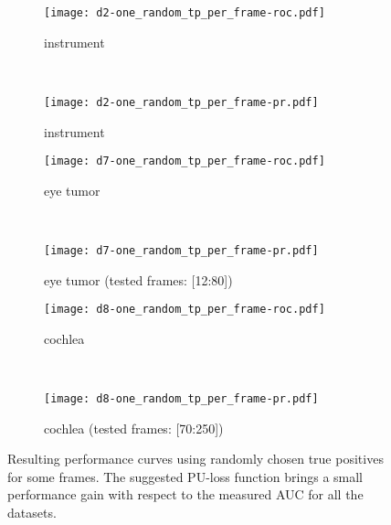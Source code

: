 \begin{figure}[ht]
	\centering
	\begin{subfigure}[h]{0.45\textwidth}
	\texttt{[image: d2-one\_random\_tp\_per\_frame-roc.pdf]}	
		\caption*{instrument}
	\end{subfigure}
	~
	\begin{subfigure}[h]{0.45\textwidth}
	\texttt{[image: d2-one\_random\_tp\_per\_frame-pr.pdf]}	
		\caption*{instrument}
	\end{subfigure}
	
	\vspace{3mm}
	\begin{subfigure}[h]{0.45\textwidth}
	\texttt{[image: d7-one\_random\_tp\_per\_frame-roc.pdf]}	
		\caption*{eye tumor}
	\end{subfigure}
	~
	\begin{subfigure}[h]{0.45\textwidth}
	\texttt{[image: d7-one\_random\_tp\_per\_frame-pr.pdf]}	
		\caption*{eye tumor (tested frames: [12:80])}
	\end{subfigure}	
	
	\vspace{3mm}
	\begin{subfigure}[h]{0.45\textwidth}
	\texttt{[image: d8-one\_random\_tp\_per\_frame-roc.pdf]}	
		\caption*{cochlea}
	\end{subfigure}
	~
	\begin{subfigure}[h]{0.45\textwidth}
	\texttt{[image: d8-one\_random\_tp\_per\_frame-pr.pdf]}	
		\caption*{cochlea (tested frames: [70:250])}
	\end{subfigure}		
	\caption{Resulting performance curves using randomly chosen true positives for some frames. The suggested PU-loss function brings a small performance gain with respect to the measured AUC for all the datasets.}
	\label{fig:one-random-tp-per-frame}
\end{figure}



